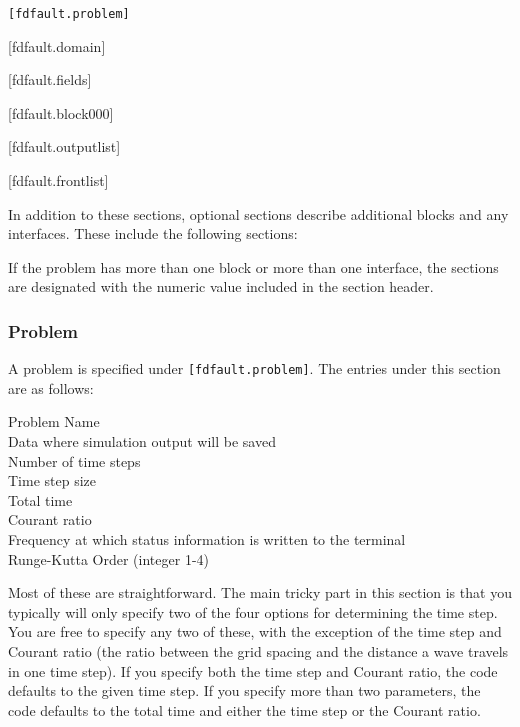 \documentclass[12pt]{article}   	%
\begin{document}
\vspace{0.1in}
{\tt [fdfault.problem]

[fdfault.domain]

[fdfault.fields]

[fdfault.block000]

[fdfault.outputlist]

[fdfault.frontlist]}

\vspace{0.1in}
\noindent In addition to these sections, optional sections describe additional blocks and any interfaces. These include the following sections:

\vspace{0.1in}

\vspace{0.1in}
\noindent If the problem has more than one block or more than one interface, the sections are designated with the numeric value included in the section header.

\subsubsection{Problem}

A problem is specified under {\tt [fdfault.problem]}. The entries under this section are as follows:

\vspace{0.1in}
Problem Name \\
\indent Data where simulation output will be saved \\
\indent Number of time steps \\
\indent Time step size \\
\indent Total time \\
\indent Courant ratio \\
\indent Frequency at which status information is written to the terminal \\
\indent Runge-Kutta Order (integer 1-4)

\vspace{0.1in}
\noindent Most of these are straightforward. The main tricky part in this section is that you typically will only specify two of the four options for determining the time step. You are free to specify any two of these, with the exception of the time step and Courant ratio (the ratio between the grid spacing and the distance a wave travels in one time step). If you specify both the time step and Courant ratio, the code defaults to the given time step. If you specify more than two parameters, the code defaults to the total time and either the time step or the Courant ratio.
\end{document}

